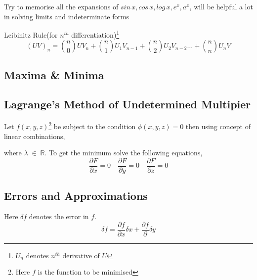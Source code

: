 \documentclass[12pt]{article}
\begin{document}
\begin{notes}
Try to memorise all the expansions of $sin\,x,cos\,x,log\,x,e^x,a^x$, will be helpful a lot in solving limits and indeterminate forms
\end{notes}

\begin{notes}
Leibinitz Rule(for $n^{th}$ differentiation)\footnote{$U_n$ denotes $n^{th}$ derivative of $U$}
\[(UV)_n= \binom{n}{0}UV_n+\binom{n}{1}U_1V_{n-1}+\binom{n}{2}U_2V_{n-2}\dots+\binom{n}{n}U_nV\]
\end{notes}

\subsection{Maxima \& Minima}

\subsection{Lagrange's Method of Undetermined Multipier}
Let $f(x,y,z)$\footnote{Here $f$ is the function to be minimised} be subject to the condition $\phi(x,y,z)=0$ then using concept of linear combinations,
\begin{center}
\end{center}
where $\lambda\;\in\;\mathbb{R}$. To get the minimum solve the following equations,
$$\frac{\partial F}{\partial x}=0\quad\frac{\partial F}{\partial y}=0\quad\frac{\partial F}{\partial z}=0$$

\subsection{Errors and Approximations}
Here $\delta f$ denotes the error in $f$.
$$\delta f=\frac{\partial f}{\partial x}\delta x+\frac{\partial f}{\partial }\delta y$$
\end{document}
